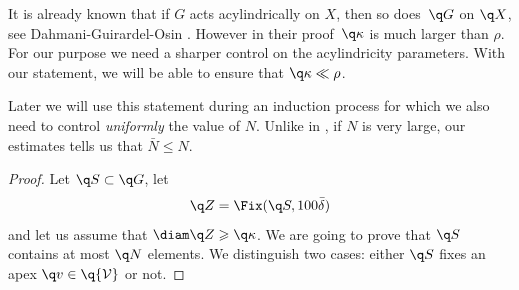 \begin{rem}
It is already known that if $G$ acts acylindrically on $X$, then so does~$\q G$ on $\q X$, see Dahmani-Guirardel-Osin \cite[Prop.\,2.17, 5.33]{dahmani_hyperbolically_2017}.
However in their proof~$\q\kappa$ is much larger than $\rho$.
For our purpose we need a sharper control on the acylindricity parameters.
With our statement, we will be able to ensure that $\q\kappa \ll \rho$.

Later we will use this statement during an induction process for which we also need to control \emph{uniformly} the value of $N$.
Unlike in \cite{dahmani_hyperbolically_2017}, if $N$ is very large, our estimates tells us that $\bar N \leq N$.
\end{rem}

\begin{proof}
Let $\q S \subset \q G$, let
\[
\q Z= \Fix(\q S, 100\bar\delta)
\]
and let us assume that $\diam \q Z \geqslant \q \kappa$.
We are going to prove that $\q S$ contains at most $\q N$ elements.
We distinguish two cases: either $\q S$ fixes an apex $\q v \in \q {\mathcal V}$ or not.


\end{proof}
